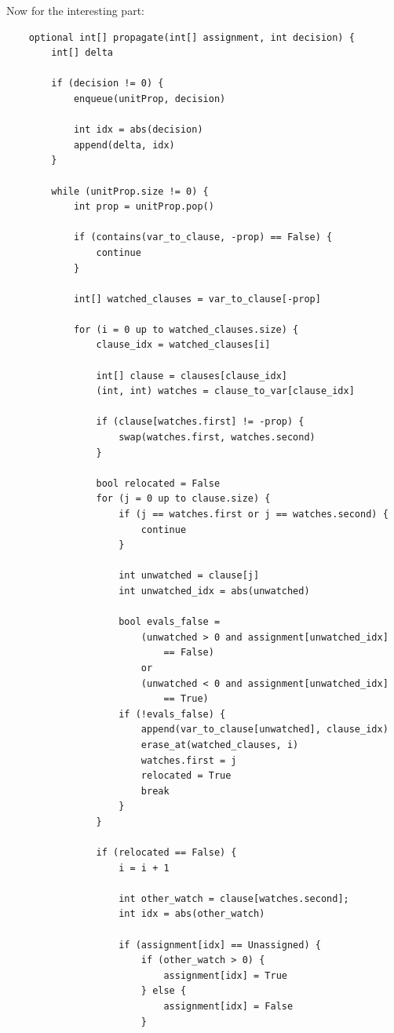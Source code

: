 \documentclass[oneside]{book}
\begin{document}
Now for the interesting part:
\begin{lstlisting}
    optional int[] propagate(int[] assignment, int decision) {
        int[] delta

        if (decision != 0) {
            enqueue(unitProp, decision)

            int idx = abs(decision)
            append(delta, idx)
        }

        while (unitProp.size != 0) {
            int prop = unitProp.pop()

            if (contains(var_to_clause, -prop) == False) {
                continue
            }

            int[] watched_clauses = var_to_clause[-prop]

            for (i = 0 up to watched_clauses.size) {
                clause_idx = watched_clauses[i]

                int[] clause = clauses[clause_idx]
                (int, int) watches = clause_to_var[clause_idx]

                if (clause[watches.first] != -prop) {
                    swap(watches.first, watches.second)
                }

                bool relocated = False
                for (j = 0 up to clause.size) {
                    if (j == watches.first or j == watches.second) {
                        continue
                    }

                    int unwatched = clause[j]
                    int unwatched_idx = abs(unwatched)

                    bool evals_false = 
                        (unwatched > 0 and assignment[unwatched_idx]
                            == False)
                        or
                        (unwatched < 0 and assignment[unwatched_idx] 
                            == True)
                    if (!evals_false) {
                        append(var_to_clause[unwatched], clause_idx)
                        erase_at(watched_clauses, i)
                        watches.first = j
                        relocated = True
                        break
                    }
                }

                if (relocated == False) {
                    i = i + 1

                    int other_watch = clause[watches.second];
                    int idx = abs(other_watch)

                    if (assignment[idx] == Unassigned) {
                        if (other_watch > 0) {
                            assignment[idx] = True
                        } else {
                            assignment[idx] = False
                        }


\end{lstlisting}
\end{document}

